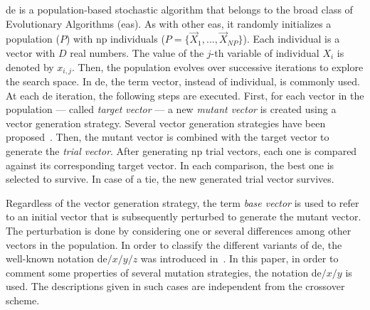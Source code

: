 \documentclass[review,3p]{elsarticle}
\newcommand{\EAS}{{\sc ea}s}
\newcommand{\DE}{{\sc de}}
\newcommand{\NP}{{\sc np}}
\begin{document}
\DE{} is a population-based stochastic algorithm that belongs to the broad class of Evolutionary Algorithms (\EAS{}).
%
As with other \EAS{}, it randomly initializes a population ($P$) with \NP{} individuals ($P = \{\vec{X}_1, ..., \vec{X}_{NP}\}$).
%
Each individual is a vector with $D$ real numbers.
%
The value of the $j$-th variable of individual $X_i$ is denoted by $x_{i,j}$.
%
Then, the population evolves over successive iterations to explore the search space.
%
In \DE{}, the term vector, instead of individual, is commonly used.
%
%
%
%
%
%
%
%
%
At each \DE{} iteration, the following steps are executed.
%
First, for each vector in the population --- called \textit{target vector} --- a new \emph{mutant vector} is created using a
vector generation strategy.
%
Several vector generation strategies have been proposed~\cite{Price:05,Neri:10}.
%
Then, the mutant vector is combined with the target vector to generate the \textit{trial vector}.
%
After generating \NP{} trial vectors, each one is compared against its corresponding target vector.
%
In each comparison, the best one is selected to survive.
%
%
In case of a tie, the new generated trial vector survives.

Regardless of the vector generation strategy, the term \textit{base vector} is used to refer to an initial vector that is subsequently
perturbed to generate the mutant vector.
%
The perturbation is done by considering one or several differences among other vectors in the population.
%
In order to classify the different variants of \DE{}, the well-known notation \DE{}$/x/y/z$ was introduced in~\cite{Storn:97}.
%
%
%
%
%
In this paper, in order to comment some properties of several mutation strategies, the notation \DE{}$/x/y$ is used.
%
The descriptions given in such cases are independent from the crossover scheme.
\end{document}
